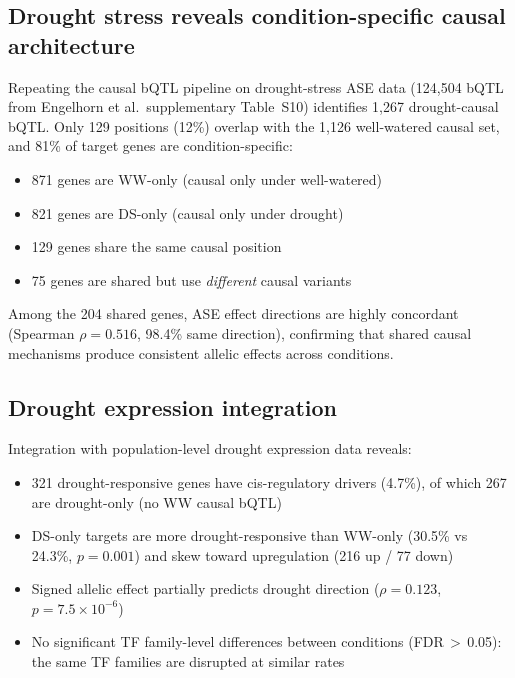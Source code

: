 \documentclass[11pt,a4paper]{article}
\begin{document}
\subsection{Drought stress reveals condition-specific causal architecture}
\label{sec:drought}

Repeating the causal bQTL pipeline on drought-stress ASE data (124,504 bQTL
from Engelhorn et al.\ supplementary Table~S10) identifies 1,267 drought-causal
bQTL. Only 129 positions (12\%) overlap with the 1,126 well-watered causal
set, and 81\% of target genes are condition-specific:
\begin{itemize}
    \item 871 genes are WW-only (causal only under well-watered)
    \item 821 genes are DS-only (causal only under drought)
    \item 129 genes share the same causal position
    \item 75 genes are shared but use \emph{different} causal variants
\end{itemize}

Among the 204 shared genes, ASE effect directions are highly concordant
(Spearman $\rho = 0.516$, 98.4\% same direction), confirming that shared
causal mechanisms produce consistent allelic effects across conditions.


\subsection{Drought expression integration}

Integration with population-level drought expression data reveals:
\begin{itemize}
    \item 321 drought-responsive genes have cis-regulatory drivers (4.7\%),
    of which 267 are drought-only (no WW causal bQTL)
    \item DS-only targets are more drought-responsive than WW-only (30.5\% vs
    24.3\%, $p = 0.001$) and skew toward upregulation (216 up / 77 down)
    \item Signed allelic effect partially predicts drought direction
    ($\rho = 0.123$, $p = 7.5 \times 10^{-6}$)
    \item No significant TF family-level differences between conditions
    (FDR\,$>$\,0.05): the same TF families are disrupted at similar rates
\end{itemize}
\end{document}
